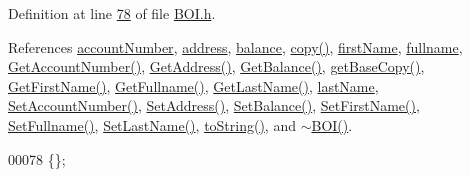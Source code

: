 Definition at line \hyperlink{_b_o_i_8h_source_l00078}{78} of file \hyperlink{_b_o_i_8h_source}{B\+O\+I.\+h}.



References \hyperlink{_b_o_i_8h_source_l00123}{account\+Number}, \hyperlink{_b_o_i_8h_source_l00131}{address}, \hyperlink{_b_o_i_8h_source_l00127}{balance}, \hyperlink{_b_o_i_8cpp_source_l00042}{copy()}, \hyperlink{_b_o_i_8h_source_l00115}{first\+Name}, \hyperlink{_b_o_i_8h_source_l00111}{fullname}, \hyperlink{_b_o_i_8cpp_source_l00096}{Get\+Account\+Number()}, \hyperlink{_b_o_i_8cpp_source_l00072}{Get\+Address()}, \hyperlink{_b_o_i_8cpp_source_l00084}{Get\+Balance()}, \hyperlink{_b_o_i_8cpp_source_l00026}{get\+Base\+Copy()}, \hyperlink{_b_o_i_8cpp_source_l00120}{Get\+First\+Name()}, \hyperlink{_b_o_i_8cpp_source_l00132}{Get\+Fullname()}, \hyperlink{_b_o_i_8cpp_source_l00108}{Get\+Last\+Name()}, \hyperlink{_b_o_i_8h_source_l00119}{last\+Name}, \hyperlink{_b_o_i_8cpp_source_l00090}{Set\+Account\+Number()}, \hyperlink{_b_o_i_8cpp_source_l00066}{Set\+Address()}, \hyperlink{_b_o_i_8cpp_source_l00078}{Set\+Balance()}, \hyperlink{_b_o_i_8cpp_source_l00114}{Set\+First\+Name()}, \hyperlink{_b_o_i_8cpp_source_l00126}{Set\+Fullname()}, \hyperlink{_b_o_i_8cpp_source_l00102}{Set\+Last\+Name()}, \hyperlink{_b_o_i_8cpp_source_l00059}{to\+String()}, and \hyperlink{_b_o_i_8cpp_source_l00017}{$\sim$\+B\+O\+I()}.


\begin{DoxyCode}
00078 \{\};
\end{DoxyCode}



